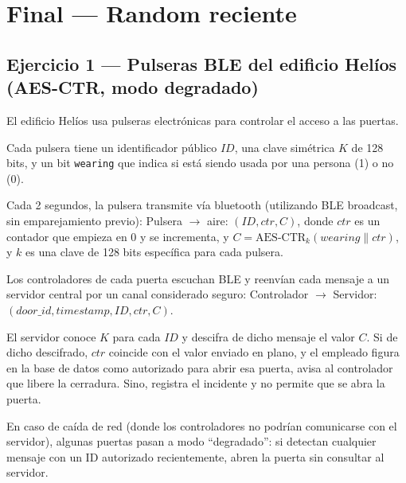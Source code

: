 \section{Final --- Random reciente}

\subsection{Ejercicio 1 --- Pulseras BLE del edificio Helíos (AES-CTR, modo degradado)}

\begin{consigna}
El edificio Helíos usa pulseras electrónicas para controlar el acceso a las puertas.

Cada pulsera tiene un identificador público $ID$, una clave simétrica $K$ de 128
bits, y un bit \texttt{wearing} que indica si está siendo usada por una persona (1)
o no (0).

Cada 2 segundos, la pulsera transmite vía bluetooth (utilizando BLE broadcast, sin
emparejamiento previo): Pulsera $\to$ aire: $(ID, ctr, C)$, donde $ctr$ es un
contador que empieza en 0 y se incrementa, y $C = \mathrm{AES\text{-}CTR}_k(
\mathit{wearing}\|ctr)$, y $k$ es una clave de 128 bits específica para cada
pulsera.

Los controladores de cada puerta escuchan BLE y reenvían cada mensaje a un
servidor central por un canal considerado seguro: Controlador $\to$ Servidor:
$(door\_id, timestamp, ID, ctr, C)$.

El servidor conoce $K$ para cada $ID$ y descifra de dicho mensaje el valor $C$. Si
de dicho descifrado, $ctr$ coincide con el valor enviado en plano, y el empleado
figura en la base de datos como autorizado para abrir esa puerta, avisa al
controlador que libere la cerradura. Sino, registra el incidente y no permite que
se abra la puerta.

En caso de caída de red (donde los controladores no podrían comunicarse con el
servidor), algunas puertas pasan a modo ``degradado'': si detectan cualquier
mensaje con un ID autorizado recientemente, abren la puerta sin consultar al
servidor.


\end{consigna}
